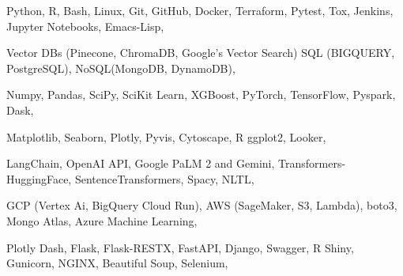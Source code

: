 


\begin{cvskills}


{
Python, R, Bash, Linux, Git, GitHub, Docker, Terraform, Pytest, Tox, Jenkins, Jupyter Notebooks, Emacs-Lisp,
}

{
Vector DBs (Pinecone, ChromaDB, Google's Vector Search) SQL (BIGQUERY, PostgreSQL), NoSQL(MongoDB, DynamoDB),
}

{
Numpy, Pandas, SciPy, SciKit Learn, XGBoost, PyTorch, TensorFlow, Pyspark, Dask,
}

{
Matplotlib, Seaborn, Plotly, Pyvis, Cytoscape, R ggplot2, Looker,
}

{
LangChain, OpenAI API, Google PaLM 2 and Gemini, Transformers-HuggingFace, SentenceTransformers, Spacy, NLTL, 
}

{
GCP (Vertex Ai, BigQuery Cloud Run), AWS (SageMaker, S3, Lambda), boto3, Mongo Atlas, Azure Machine Learning,
}

{
Plotly Dash, Flask, Flask-RESTX, FastAPI, Django, Swagger, R Shiny, Gunicorn, NGINX, Beautiful Soup, Selenium,
}






\end{cvskills}
